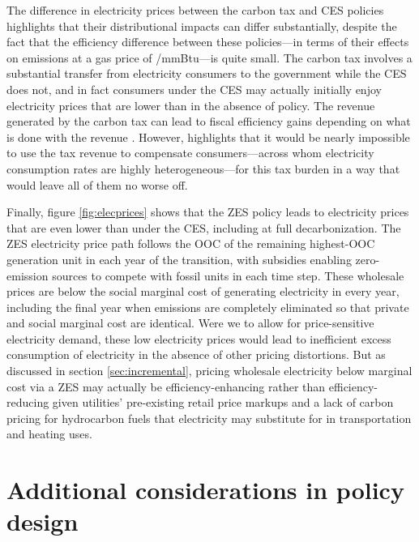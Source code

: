 \documentclass[12pt]{article}
\begin{document}
The difference in electricity prices between the carbon tax and CES policies highlights that their distributional impacts can differ substantially, despite the fact that the efficiency difference between these policies---in terms of their effects on emissions at a gas price of \unskip/mmBtu---is quite small. The carbon tax involves a substantial transfer from electricity consumers to the government while the CES does not, and in fact consumers under the CES may actually initially enjoy electricity prices that are lower than in the absence of policy. The revenue generated by the carbon tax can lead to fiscal efficiency gains depending on what is done with the revenue \citep{williams2017}. However, \cite{sallee2019pigou} highlights that it would be nearly impossible to use the tax revenue to compensate consumers---across whom electricity consumption rates are highly heterogeneous---for this tax burden in a way that would leave all of them no worse off.

Finally, figure \ref{fig:elecprices} shows that the ZES policy leads to electricity prices that are even lower than under the CES, including at full decarbonization. The ZES electricity price path follows the OOC of the remaining highest-OOC generation unit in each year of the transition, with subsidies enabling zero-emission sources to compete with fossil units in each time step. These wholesale prices are below the social marginal cost of generating electricity in every year, including the final year when emissions are completely eliminated so that private and social marginal cost are identical. Were we to allow for price-sensitive electricity demand, these low electricity prices would lead to inefficient excess consumption of electricity in the absence of other pricing distortions. But as discussed in section \ref{sec:incremental}, pricing wholesale electricity below marginal cost via a ZES may actually be efficiency-enhancing rather than efficiency-reducing given utilities' pre-existing retail price markups and a lack of carbon pricing for hydrocarbon fuels that electricity may substitute for in transportation and heating uses.





\section{Additional considerations in policy design}\label{sec:additionalconsiderations}
\end{document}
